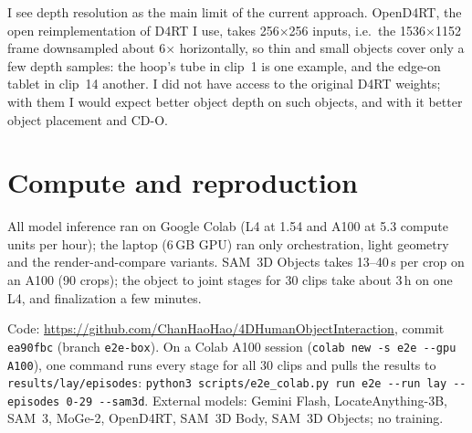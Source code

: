 \documentclass[10pt,twocolumn]{article}
\begin{document}
I see depth resolution as the main limit of the current approach. OpenD4RT, the open reimplementation of D4RT I
use, takes 256$\times$256 inputs, i.e.\ the 1536$\times$1152 frame downsampled about 6$\times$ horizontally, so thin
and small objects cover only a few depth samples: the hoop's tube in clip~1 is one example, and the edge-on tablet
in clip~14 another. I did not have access to the original D4RT weights; with them I would expect better object
depth on such objects, and with it better object placement and CD-O.

\section{Compute and reproduction}
All model inference ran on Google Colab (L4 at 1.54 and A100 at 5.3 compute units per hour); the laptop (6\,GB GPU) ran
only orchestration, light geometry and the render-and-compare variants. SAM~3D Objects takes 13--40\,s per crop on an A100 (90 crops); the
object to joint stages for 30 clips take about 3\,h on one L4, and finalization a few minutes.

Code: \url{https://github.com/ChanHaoHao/4DHumanObjectInteraction}, commit \texttt{ea90fbc} (branch \texttt{e2e-box}). On a Colab A100 session (\texttt{colab new -s e2e -{}-gpu A100}), one command runs every stage
for all 30 clips and pulls the results to \texttt{results/lay/episodes}:
\texttt{python3 scripts/e2e\_colab.py run e2e -{}-run lay -{}-episodes 0-29 -{}-sam3d}.
External models: Gemini Flash, LocateAnything-3B, SAM~3, MoGe-2, OpenD4RT, SAM~3D Body, SAM~3D Objects; no
training.
\end{document}
